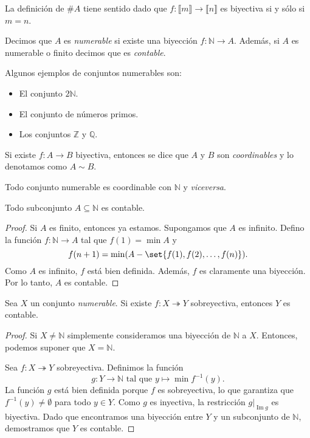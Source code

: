 \begin{remark}
    La definición de $\# A$ tiene sentido dado que $f: \llbracket m \rrbracket \to \llbracket n \rrbracket$ es biyectiva si y sólo si $m = n$.
\end{remark}

\begin{definition}
    Decimos que $A$ es \emph{numerable} si existe una biyección $f: \mathbb{N} \to  A$. Además, si $A$ es numerable o finito decimos que es \emph{contable}.
\end{definition}

Algunos ejemplos de conjuntos numerables son:

\begin{itemize}
    \item El conjunto $2 \mathbb{N}$.
    \item El conjunto de números primos.
    \item Los conjuntos $\mathbb{Z}$ y $\mathbb{Q}$.
\end{itemize}

\begin{definition}
    Si existe $f: A \to  B$ biyectiva, entonces se dice que $A$ y $B$ son \emph{coordinables} y lo denotamos como $A \sim B$.
\end{definition}

\begin{remark}
    Todo conjunto numerable es coordinable con $\mathbb{N}$ y \textit{viceversa}.
\end{remark}

\begin{lemma}
    Todo subconjunto $A \subseteq \mathbb{N}$ es contable.
\end{lemma}

\begin{proof}
    Si $A$ es finito, entonces ya estamos. Supongamos que $A$ es infinito. Defino la función $f: \mathbb{N} \to A$ tal que $f(1) = \min A$ y 
    $$
        f(n+1) = \min (A - \set{ f(1), f(2), \dots, f(n) }).
    $$
    Como $A$ es infinito, $f$ está bien definida. Además, $f$ es claramente una biyección. Por lo tanto, $A$ es contable.
\end{proof}

\begin{proposition}
    Sea $X$ un conjunto \textit{numerable}. Si existe $f: X \twoheadrightarrow Y$ sobreyectiva, entonces $Y$ es contable. 
\end{proposition}

\begin{proof}
    Si $X \neq \mathbb{N}$ simplemente consideramos una biyección de $\mathbb{N}$ a $X$. Entonces, podemos suponer que $X = \mathbb{N}$. 
        
    Sea $f: X \twoheadrightarrow Y$ sobreyectiva. Definimos la función
    $$
        g: Y \to \mathbb{N} \text{ tal que } y \mapsto \min f^{-1}(y).
    $$
    La función $g$ está bien definida porque $f$ es sobreyectiva, lo que garantiza que $f^{-1}(y) \neq \emptyset$ para todo $y \in Y$. Como $g$ es inyectiva, la restricción $g|_{\operatorname{Im}g}$ es biyectiva. Dado que encontramos una biyección entre $Y$ y un subconjunto de $\mathbb{N}$, demostramos que $Y$ es contable.
\end{proof}

